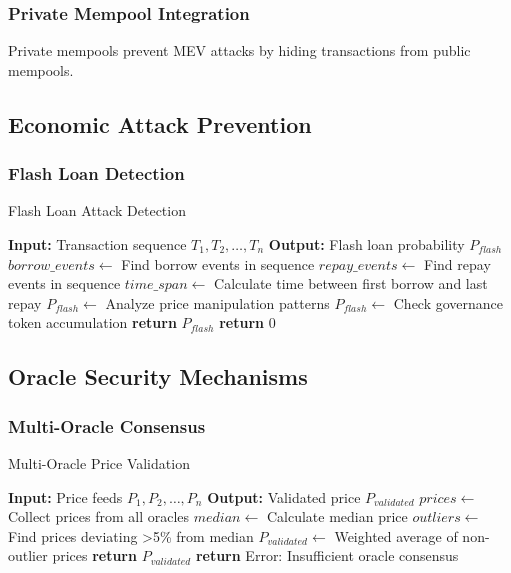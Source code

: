 \documentclass[11pt,a4paper]{article}
\begin{document}
\subsubsection{Private Mempool Integration}

Private mempools prevent MEV attacks by hiding transactions from public mempools.

\subsection{Economic Attack Prevention}

\subsubsection{Flash Loan Detection}

\begin{algorithm}
\caption{Flash Loan Attack Detection}
\begin{algorithmic}[1]
\STATE \textbf{Input:} Transaction sequence $T_1, T_2, \ldots, T_n$
\STATE \textbf{Output:} Flash loan probability $P_{flash}$
\STATE
\STATE $borrow\_events \leftarrow$ Find borrow events in sequence
\STATE $repay\_events \leftarrow$ Find repay events in sequence
\STATE $time\_span \leftarrow$ Calculate time between first borrow and last repay
\STATE
{}
    \STATE $P_{flash} \leftarrow$ Analyze price manipulation patterns
    \STATE $P_{flash} \leftarrow$ Check governance token accumulation
    \STATE \textbf{return} $P_{flash}$
\ELSE
    \STATE \textbf{return} $0$
\ENDIF
\end{algorithmic}
\end{algorithm}

\subsection{Oracle Security Mechanisms}

\subsubsection{Multi-Oracle Consensus}

\begin{algorithm}
\caption{Multi-Oracle Price Validation}
\begin{algorithmic}[1]
\STATE \textbf{Input:} Price feeds $P_1, P_2, \ldots, P_n$
\STATE \textbf{Output:} Validated price $P_{validated}$
\STATE
\STATE $prices \leftarrow$ Collect prices from all oracles
\STATE $median \leftarrow$ Calculate median price
\STATE $outliers \leftarrow$ Find prices deviating >5\% from median
\STATE
{}
    \STATE $P_{validated} \leftarrow$ Weighted average of non-outlier prices
    \STATE \textbf{return} $P_{validated}$
\ELSE
    \STATE \textbf{return} Error: Insufficient oracle consensus
\ENDIF
\end{algorithmic}
\end{algorithm}
\end{document}
